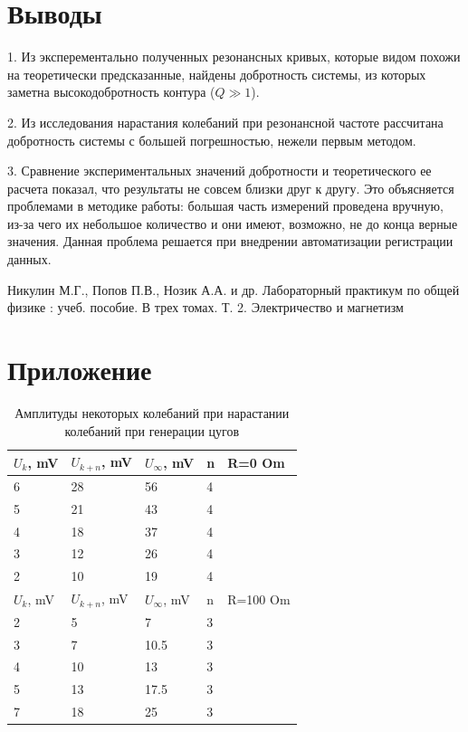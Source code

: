 \documentclass[a4paper,12pt]{article} %
\begin{document}
\section{Выводы}

\hspace{5mm}1. Из эксперементально полученных резонансных кривых, которые видом похожи на теоретически предсказанные, найдены добротность системы, из которых заметна высокодобротность контура ($Q\gg 1$).

2. Из исследования нарастания колебаний при резонансной частоте рассчитана добротность системы с большей погрешностью, нежели первым методом.

3. Сравнение экспериментальных значений добротности и теоретического ее расчета показал, что результаты не совсем близки друг к другу. Это объясняется проблемами в методике работы: большая часть измерений проведена вручную, из-за чего их небольшое количество и они имеют, возможно, не до конца верные значения. Данная проблема решается при внедрении автоматизации регистрации данных.



\begin{thebibliography}{}
      Никулин М.Г., Попов П.В., Нозик А.А. и др. Лабораторный практикум по общей физике : учеб. пособие. В трех томах. Т. 2. Электричество и магнетизм
\end{thebibliography}


\section*{Приложение}
\begin{table}[h!]
\caption{Амплитуды некоторых колебаний при нарастании колебаний при генерации цугов}
\label{нарост}
\begin{tabular}{|l|l|l|l|l|}
\hline
$U_k$, mV & $U_{k+n}$, mV & $U_\infty$, mV & n & R=0 Om   \\ \hline
6         & 28            & 56             & 4 &          \\ \hline
5         & 21            & 43             & 4 &          \\ \hline
4         & 18            & 37             & 4 &          \\ \hline
3         & 12            & 26             & 4 &          \\ \hline
2         & 10            & 19             & 4 &          \\ \hline
$U_k$, mV & $U_{k+n}$, mV & $U_\infty$, mV & n & R=100 Om \\ \hline
2         & 5             & 7              & 3 &          \\ \hline
3         & 7             & 10.5           & 3 &          \\ \hline
4         & 10            & 13             & 3 &          \\ \hline
5         & 13            & 17.5           & 3 &          \\ \hline
7         & 18            & 25             & 3 &          \\ \hline
\end{tabular}
\end{table}
\end{document}
